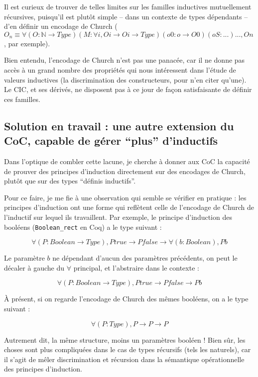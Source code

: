 \documentclass[]{article}
\begin{document}
Il est curieux de trouver de telles limites sur les familles inductives
mutuellement récursives, puisqu'il est plutôt simple -- dans un contexte
de types dépendants -- d'en définir un encodage de Church
(\(O_{n} \equiv \forall (O:\mathbb{N} \rightarrow Type) (M:\forall i, O i \rightarrow O i \rightarrow Type) (o0 : o \rightarrow O 0) (oS : ...) ..., O n\),
par exemple).

Bien entendu, l'encodage de Church n'est pas une panacée, car il ne
donne pas accès à un grand nombre des propriétés qui nous intéressent
dans l'étude de valeurs inductives (la discrimination des constructeurs,
pour n'en citer qu'une). Le CIC, et ses dérivés, ne disposent pas à ce
jour de façon satisfaisante de définir ces familles.

\subsection{\texorpdfstring{Solution en travail : une autre extension du
CoC, capable de gérer ``plus''
d'inductifs}{Solution en travail : une autre extension du CoC, capable de gérer plus d'inductifs}}\label{solution-en-travail-une-autre-extension-du-coc-capable-de-guxe9rer-plus-dinductifs}

Dans l'optique de combler cette lacune, je cherche à donner aux CoC la
capacité de prouver des principes d'induction directement sur des
encodages de Church, plutôt que sur des types ``définis inductifs''.

Pour ce faire, je me fie à une observation qui semble se vérifier en
pratique : les principes d'induction ont une forme qui reflètent celle
de l'encodage de Church de l'inductif sur lequel ils travaillent. Par
exemple, le principe d'induction des booléens (\texttt{Boolean\_rect} en
Coq) a le type suivant :

\[
\forall (P:Boolean \rightarrow Type), P true \rightarrow P false \rightarrow \forall (b:Boolean), P b
\]

Le paramètre \(b\) ne dépendant d'aucun des paramètres précédents, on
peut le décaler à gauche du \(\forall\) principal, et l'abstraire dans
le contexte :

\[
\forall (P:Boolean \rightarrow Type), P true \rightarrow P false \rightarrow P b
\]

À présent, si on regarde l'encodage de Church des mêmes booléens, on a
le type suivant :

\[
\forall (P:Type), P \rightarrow P \rightarrow P
\]

Autrement dit, la même structure, moins un paramètres booléen ! Bien
sûr, les choses sont plus compliquées dans le cas de types récursifs
(tels les naturels), car il s'agit de mêler discrimination et récursion
dans la sémantique opérationnelle des principes d'induction.
\end{document}

